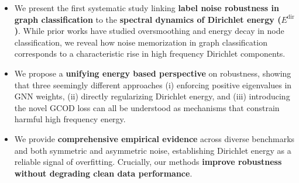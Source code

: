 \begin{itemize}
\item We present the first systematic study linking \textbf{label noise robustness in graph classification}  to the \textbf{spectral dynamics of Dirichlet energy ($E^{\text{dir}}$)}. While prior works have studied oversmoothing  and energy decay in node classification, we reveal how noise memorization in graph classification  corresponds to a characteristic rise in high frequency Dirichlet components.
\item We propose a \textbf{unifying energy based perspective} on robustness, showing that three seemingly 
different approaches (i) enforcing positive eigenvalues in GNN weights, (ii) directly regularizing 
Dirichlet energy, and (iii) introducing the novel GCOD loss can all be understood as mechanisms 
that constrain harmful high frequency energy.
\item We provide \textbf{comprehensive empirical evidence} across diverse benchmarks and both symmetric and asymmetric noise, establishing  Dirichlet energy as a reliable signal of overfitting. Crucially, our methods \textbf{improve robustness without degrading clean data performance}.
\end{itemize}

